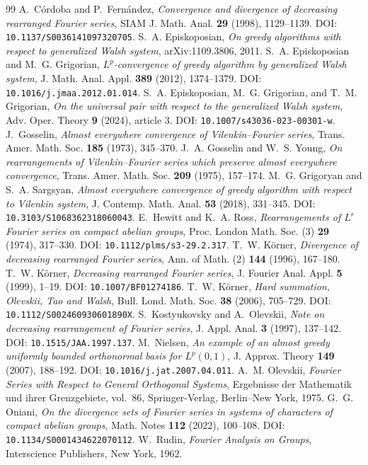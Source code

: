 \documentclass[11pt]{amsart}
\theoremstyle{definition}
\theoremstyle{remark}
\begin{document}
\begingroup
\sloppy
\begin{thebibliography}{99}
A.~C\'ordoba and P.~Fern\'andez,
\emph{Convergence and divergence of decreasing rearranged Fourier series},
SIAM J. Math. Anal. \textbf{29} (1998), 1129--1139.
DOI: \nolinkurl{10.1137/S0036141097320705}.
S.~A. Episkoposian,
\emph{On greedy algorithms with respect to generalized Walsh system},
arXiv:1109.3806, 2011.
S.~A. Episkoposian and M.~G. Grigorian,
\emph{\(L^p\)-convergence of greedy algorithm by generalized Walsh system},
J. Math. Anal. Appl. \textbf{389} (2012), 1374--1379.
DOI: \nolinkurl{10.1016/j.jmaa.2012.01.014}.
S.~A. Episkoposian, M.~G. Grigorian, and T.~M. Grigorian,
\emph{On the universal pair with respect to the generalized Walsh system},
Adv. Oper. Theory \textbf{9} (2024), article 3.
DOI: \nolinkurl{10.1007/s43036-023-00301-w}.
J.~Gosselin, \emph{Almost everywhere convergence of Vilenkin--Fourier series},
Trans. Amer. Math. Soc. \textbf{185} (1973), 345--370.
J.~A. Gosselin and W.~S. Young,
\emph{On rearrangements of Vilenkin--Fourier series which preserve
almost everywhere convergence},
Trans. Amer. Math. Soc. \textbf{209} (1975), 157--174.
M.~G. Grigoryan and S.~A. Sargsyan,
\emph{Almost everywhere convergence of greedy algorithm with respect to
Vilenkin system},
J. Contemp. Math. Anal. \textbf{53} (2018), 331--345.
DOI: \nolinkurl{10.3103/S1068362318060043}.
E.~Hewitt and K.~A. Ross,
\emph{Rearrangements of \(L^r\) Fourier series on compact abelian groups},
Proc. London Math. Soc. (3) \textbf{29} (1974), 317--330.
DOI: \nolinkurl{10.1112/plms/s3-29.2.317}.
T.~W. K\"orner, \emph{Divergence of decreasing rearranged Fourier series},
Ann. of Math. (2) \textbf{144} (1996), 167--180.
T.~W. K\"orner, \emph{Decreasing rearranged Fourier series},
J. Fourier Anal. Appl. \textbf{5} (1999), 1--19.
DOI: \nolinkurl{10.1007/BF01274186}.
T.~W. K\"orner, \emph{Hard summation, Olevskii, Tao and Walsh},
Bull. Lond. Math. Soc. \textbf{38} (2006), 705--729.
DOI: \nolinkurl{10.1112/S002460930601890X}.
S.~Kostyukovsky and A.~Olevskii,
\emph{Note on decreasing rearrangement of Fourier series},
J. Appl. Anal. \textbf{3} (1997), 137--142.
DOI: \nolinkurl{10.1515/JAA.1997.137}.
M.~Nielsen,
\emph{An example of an almost greedy uniformly bounded orthonormal basis
for \(L^p(0,1)\)},
J. Approx. Theory \textbf{149} (2007), 188--192.
DOI: \nolinkurl{10.1016/j.jat.2007.04.011}.
A.~M. Olevskii,
\emph{Fourier Series with Respect to General Orthogonal Systems},
Ergebnisse der Mathematik und ihrer Grenzgebiete, vol.~86,
Springer-Verlag, Berlin--New York, 1975.
G.~G. Oniani,
\emph{On the divergence sets of Fourier series in systems of characters
of compact abelian groups},
Math. Notes \textbf{112} (2022), 100--108.
DOI: \nolinkurl{10.1134/S0001434622070112}.
W.~Rudin, \emph{Fourier Analysis on Groups},
Interscience Publishers, New York, 1962.
\end{thebibliography}
\endgroup
\end{document}
